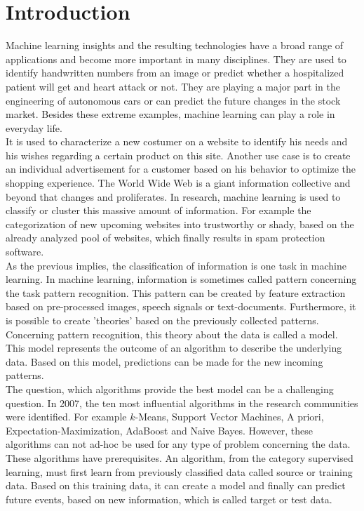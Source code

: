 \chapter{Introduction}
Machine learning insights and the resulting technologies have a broad range of applications and become more important in many disciplines.
They are used to identify handwritten numbers from an image or predict whether a hospitalized patient will get and heart attack or not. 
They are playing a major part in the engineering of autonomous cars or can predict the future changes in the stock market.
Besides these extreme examples, machine learning can play a role in everyday life.\\
It is used to characterize a new costumer on a website to identify his needs and his wishes regarding a certain product on this site.
Another use case is to create an individual advertisement for a customer based on his behavior to optimize the shopping experience.
The World Wide Web is a giant information collective and beyond that changes and proliferates.
In research, machine learning is used to classify or cluster this massive amount of information.
For example the categorization of new upcoming websites into trustworthy or shady, based on the already analyzed pool of websites, which finally results in spam protection software.\\
As the previous implies, the classification of information is one task in machine learning.
In machine learning, information is sometimes called pattern concerning the task pattern recognition.
This pattern can be created by feature extraction based on pre-processed images, speech signals or text-documents.
Furthermore, it is possible to create 'theories' based on the previously collected patterns.
Concerning pattern recognition, this theory about the data is called a model. 
This model represents the outcome of an algorithm to describe the underlying data.
Based on this model, predictions can be made for the new incoming patterns.\\
The question, which algorithms provide the best model can be a challenging question.
In 2007, the ten most influential algorithms in the research communities were identified.
For example $k$-Means, Support Vector Machines, A priori, Expectation-Maximization, AdaBoost and Naive Bayes.
However, these algorithms can not ad-hoc be used for any type of problem concerning the data.
These algorithms have prerequisites.
An algorithm, from the category supervised learning, must first learn from previously classified data called source or training data. Based on this training data, it can create a model and finally can predict future events, based on new information, which is called target or test data.
